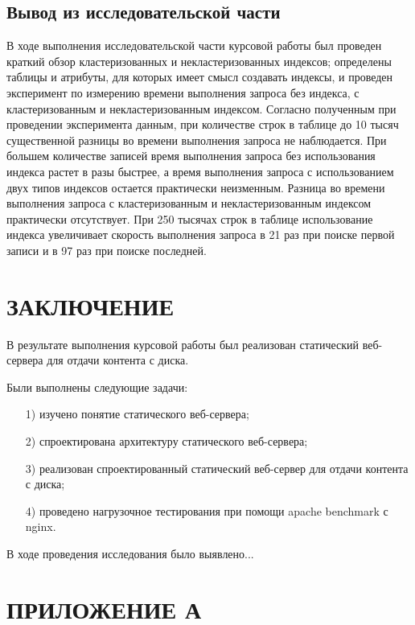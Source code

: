 \documentclass{bmstu}
\begin{document}
\section*{Вывод из исследовательской части}

В ходе выполнения исследовательской части курсовой работы был проведен краткий обзор кластеризованных и некластеризованных индексов; определены таблицы и атрибуты, для которых имеет смысл создавать индексы, и проведен эксперимент по измерению времени выполнения запроса без индекса, с кластеризованным и некластеризованным индексом. 
Согласно полученным при проведении эксперимента данным, при количестве строк в таблице до 10 тысяч существенной разницы во времени выполнения запроса не наблюдается. 
При большем количестве записей время выполнения запроса без использования индекса растет в разы быстрее, а время выполнения запроса с использованием двух типов индексов остается практически неизменным. 
Разница во времени выполнения запроса с кластеризованным и некластеризованным индексом практически отсутствует. 
При 250 тысячах строк в таблице использование индекса увеличивает скорость выполнения запроса в 21 раз при поиске первой записи и в 97 раз при поиске последней.

{\centering \chapter*{ЗАКЛЮЧЕНИЕ}}

В результате выполнения курсовой работы был реализован статический веб-сервера для отдачи контента с диска.

Были выполнены следующие задачи:
\begin{enumerate}
\item[1)] изучено понятие статического веб-сервера;
\item[2)] спроектирована архитектуру статического веб-сервера;
\item[3)] реализован спроектированный статический веб-сервер для отдачи контента с диска;
\item[4)] проведено нагрузочное тестирования при помощи apache benchmark с nginx.
\end{enumerate}

В ходе проведения исследования было выявлено...

{\centering \printbibliography[title=СПИСОК ИСПОЛЬЗОВАННЫХ ИСТОЧНИКОВ,heading=bibintoc]}

{\centering \chapter*{ПРИЛОЖЕНИЕ А}}
\end{document}
